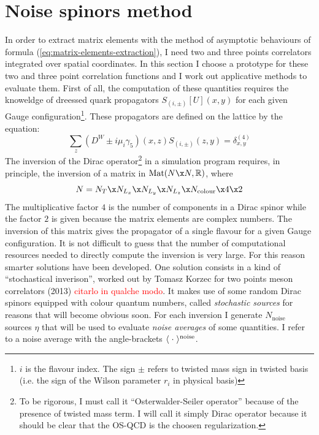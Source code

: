 \documentclass[english, LaM, oneside, noexaminfo]{sapthesis}
\newcommand{\colr}{\textcolor{red}}
\begin{document}
\section{Noise spinors method}
\noindent
In order to extract matrix elements with the method of asymptotic behaviours of formula (\ref{eq:matrix-elements-extraction}), I need two and three points correlators integrated over spatial coordinates.
In this section I choose a prototype for these two and three point correlation functions and I work out applicative methods to evaluate them.
\newline
First of all, the computation of these quantities requires the knoweldge of dreessed quark propagators $S_{(i,\pm)}[U](x,y)$ for each given Gauge configuration\footnote{$i$ is the flavour index. The sign $\pm$ refers to twisted mass sign in twisted basis (i.e. the sign of the Wilson parameter $r_i$ in physical basis)}.
These propagators are defined on the lattice by the equation:
\begin{equation*}
    \sum_{z} \left(D^W\pm i\mu_i \gamma_5\right)(x,z) S_{(i,\pm)}(z,y) = \delta_{x,y}^{(4)}
\end{equation*}
The inversion of the Dirac operator\footnote{To be rigorous, I must call it ``Osterwalder-Seiler operator'' because of the presence of twisted mass term. I will call it simply Dirac operator because it should be clear that the OS-QCD is the choosen regularization.}
in a simulation program requires, in principle, the inversion of a matrix in $\text{Mat}(N\x N,\mathbb{R})$, where
$$N = N_T \x N_{L_x} \x N_{L_y} \x N_{L_z} \x N_\text{colour} \x 4 \x 2 $$
The multiplicative factor $4$ is the number of components in a Dirac spinor while the factor $2$ is given because the matrix elements are complex numbers.
The inversion of this matrix gives the propagator of a single flavour for a given Gauge configuration.
It is not difficult to guess that the number of computational resources needed to directly compute the inversion is very large.
For this reason smarter solutions have been developed.
\newline
One solution consists in a kind of ``stochastical inverison'', worked out by Tomasz Korzec for two points meson correlators (2013) \colr{citarlo in qualche modo}.
It makes use of some random Dirac spinors equipped with colour quantum numbers, called \textit{stochastic sources} for reasons that will become obvious soon.
For each inversion I generate $N_\text{noise}$ sources $\eta$ that will be used to evaluate \textit{noise averages} of some quantities.
I refer to a noise average with the angle-brackets $\langle\hspace{1mm}\cdot\hspace{1mm}\rangle^\text{noise}$. 
\end{document}
